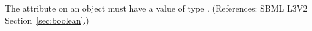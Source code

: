 The attribute  on an \Trigger object must
have a value of type .  (References: SBML L3V2
Section~\ref{sec:boolean}.)
